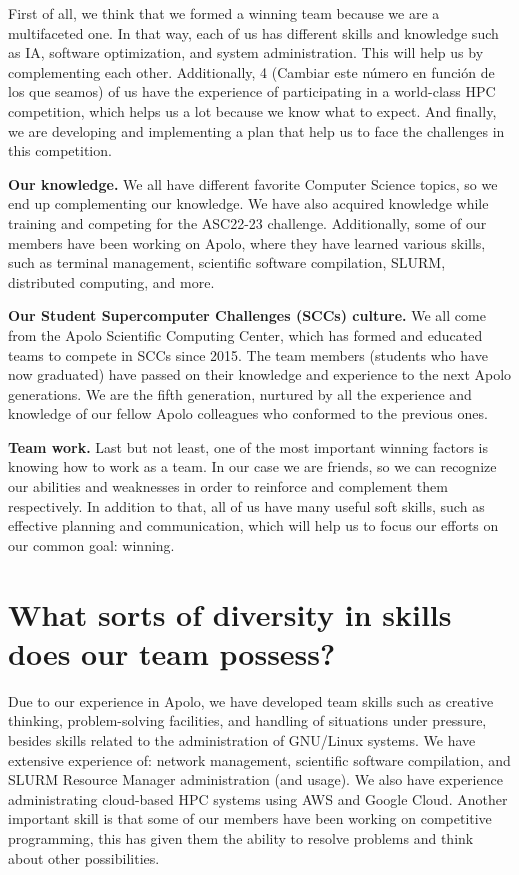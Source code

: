 \documentclass[11pt,a4paper,twocolumn]{article}
\begin{document}
First of all, we think that we formed a winning team because we are a multifaceted one. In that way, each of us has different skills and knowledge such as IA, software optimization, and system administration. This will help us by complementing each other. Additionally, 4 (Cambiar este número en función de los que seamos) of us have the experience of participating in a world-class HPC competition, which helps us a lot because we know what to expect. And finally, we are developing and implementing a plan that help us to face the challenges in this competition.

\textbf{Our knowledge.} We all have different favorite Computer Science topics, so we end up complementing our knowledge. We have also acquired knowledge while training and competing for the ASC22-23 challenge. Additionally, some of our members have been working on Apolo, where they have learned various skills, such as terminal management, scientific software compilation, SLURM, distributed computing, and more.

\textbf{Our Student Supercomputer Challenges (SCCs) culture.} We all come from the Apolo Scientific Computing Center, which has formed and educated teams to compete in SCCs since 2015. The team members (students who have now graduated) have passed on their knowledge and experience to the next Apolo generations. We are the fifth generation, nurtured by all the experience and knowledge of our fellow Apolo colleagues who conformed to the previous ones.

\textbf{Team work.} Last but not least, one of the most important winning factors is knowing how to work as a team. In our case we are friends, so we can recognize our abilities and weaknesses in order to reinforce and complement them respectively. In addition to that, all of us have many useful soft skills, such as effective planning and communication, which will help us to focus our efforts on our common goal: winning.

\section{What sorts of diversity in skills does our team possess?}

Due to our experience in Apolo, we have developed team skills such as creative thinking, problem-solving facilities, and handling of situations under pressure, besides skills related to the administration of GNU/Linux systems. We have extensive experience of: network management, scientific software compilation, and SLURM Resource Manager administration (and usage). We also have experience administrating cloud-based HPC systems using AWS and Google Cloud. Another important skill is that some of our members have been working on competitive programming, this has given them the ability to resolve problems and think about other possibilities.
\end{document}
